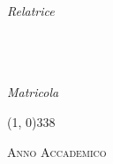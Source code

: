 \begin{titlepage}
\begin{center}
        \vspace{50pt}
        
        \begin{normalsize}
            \begin{flushleft}
                \textit{Relatrice}\\
                \profTitle\ \myProf
            \end{flushleft}

            \vspace{-48pt}
            
            \begin{flushright}
                \textit{\graduateTitle}\\
                \myName\\
                \textit{Matricola} \myStudentID
            \end{flushright}
        \end{normalsize}

        \vspace*{\fill}
        
        \line(1, 0){338} \\
        \begin{normalsize}
            \textsc{Anno Accademico \myAA}
        \end{normalsize}
    \end{center}
\end{titlepage}